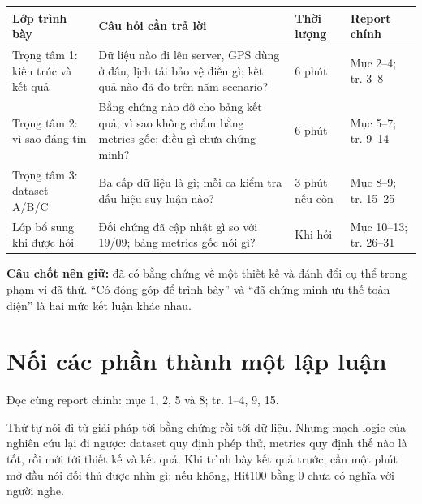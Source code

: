 \documentclass[10pt,a4paper]{article}
\newcommand{\key}[1]{\par\smallskip\noindent\colorbox{pale}{\parbox{\dimexpr\linewidth-2\fboxsep}{#1}}\par\smallskip}
\newcommand{\where}[1]{\par{\small\color{gray}Đọc cùng report chính: #1.}\par}
\newcommand{\guidepage}[1]{\clearpage\section{#1}}
\begin{document}
\begin{longtable}{@{}P{3.4cm}P{7.3cm}P{2.2cm}P{3.3cm}@{}}
\toprule Lớp trình bày & Câu hỏi cần trả lời & Thời lượng & Report chính\\\midrule
Trọng tâm 1: kiến trúc và kết quả & Dữ liệu nào đi lên server, GPS dùng ở đâu, lịch tải bảo vệ điều gì; kết quả nào đã đo trên năm scenario? & 6 phút & Mục 2--4; tr. 3--8\\[3pt]
Trọng tâm 2: vì sao đáng tin & Bằng chứng nào đỡ cho bảng kết quả; vì sao không chấm bằng metrics gốc; điều gì chưa chứng minh? & 6 phút & Mục 5--7; tr. 9--14\\[3pt]
Trọng tâm 3: dataset A/B/C & Ba cấp dữ liệu là gì; mỗi ca kiểm tra dấu hiệu suy luận nào? & 3 phút nếu còn & Mục 8--9; tr. 15--25\\[3pt]
Lớp bổ sung khi được hỏi & Đối chứng đã cập nhật gì so với 19/09; bảng metrics gốc nói gì? & Khi hỏi & Mục 10--13; tr. 26--31\\
\bottomrule
\end{longtable}
\key{\textbf{Câu chốt nên giữ:} đã có bằng chứng về một thiết kế và đánh đổi cụ thể trong phạm vi đã thử. ``Có đóng góp để trình bày'' và ``đã chứng minh ưu thế toàn diện'' là hai mức kết luận khác nhau.}

\guidepage{Nối các phần thành một lập luận}
\where{mục 1, 2, 5 và 8; tr. 1--4, 9, 15}
Thứ tự nói đi từ giải pháp tới bằng chứng rồi tới dữ liệu. Nhưng mạch logic của nghiên cứu lại đi ngược: dataset quy định phép thử, metrics quy định thế nào là tốt, rồi mới tới thiết kế và kết quả. Khi trình bày kết quả trước, cần một phút mở đầu nói đối thủ được nhìn gì; nếu không, Hit100 bằng 0 chưa có nghĩa với người nghe.

\begin{center}
\end{center}
\end{document}
